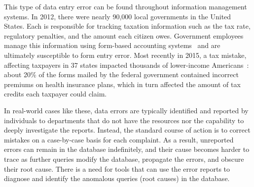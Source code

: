 

This type of data entry error can be found throughout information
management systems. In 2012, there were nearly 90,000 local
governments in the United States. Each is responsible for tracking
taxation information such as the tax rate, regulatory penalties, and
the amount each citizen owes. Government employees manage this
information using form-based accounting
systems~\cite{reutersmanagement} and are ultimately susceptible to
form entry error. Most recently in 2015, a tax mistake, affecting
taxpayers in 37 states impacted thousands of lower-income
Americans~\cite{nyt-tax-article}: about 20\% of the forms mailed by the federal government contained incorrect premiums on health insurance plans, which in turn affected the amount of tax credits each taxpayer could claim.  

In real-world cases like these,
data errors are typically identified and reported by
individuals to departments that do not have the resources nor the
capability to deeply investigate the reports. Instead, the standard
course of action is to correct mistakes on a case-by-case basis for
each complaint. As a result, unreported errors can remain in the
database indefinitely, and their cause becomes harder to trace as
further queries modify the database, propagate the errors, and obscure
their root cause. There is a need for tools that can use the error
reports to diagnose and identify the anomalous queries (root causes)
in the database.


